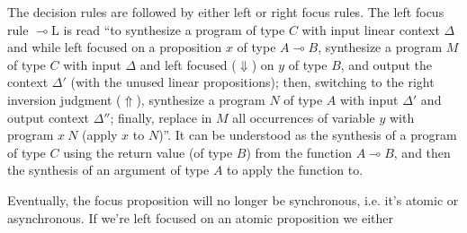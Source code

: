 \documentclass{llncs}
\newcommand{\lolli}{\multimap}
\newcommand{\tensor}{\otimes}
\newcommand{\bang}{{!}}
\begin{document}
The decision rules are followed by either left or right focus rules. The left
focus rule $\lolli$L is read ``to synthesize a program of type $C$ with input
linear context $\Delta$ and while left focused on a proposition $x$ of type $A
\lolli B$, synthesize a program $M$ of type $C$ with input $\Delta$ and 
left focused ($\Downarrow$) on $y$ of type
$B$, and output the context $\Delta'$ (with the unused
linear propositions); then, switching to the right inversion judgment ($\Uparrow$), synthesize a program $N$ of type $A$ with input
$\Delta'$ and output context $\Delta''$; finally, replace in $M$ all occurrences
of variable $y$ with program $x\ N$ (apply $x$ to $N$)''. It can be understood
as the synthesis of a program of type $C$ using the return value (of type $B$) from the function $A \lolli B$, and then the
synthesis of an argument of type $A$ to apply the function to.
%
Eventually, the focus proposition will no longer be synchronous, i.e. it's
atomic or asynchronous. If we're left focused on an atomic proposition we either
\end{document}
